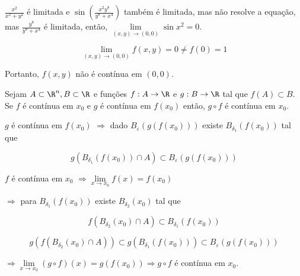 \documentclass[11pt, oneside, a4paper]{gsm-l}
\begin{document}
\begin{sol}
    $\displaystyle \frac{{x^2 }}{{x^2  + y^2 }}$ é limitada e $\displaystyle \sin \left( {\frac{{x^2 y^8 }}{{y^8  + x^4 }}} \right)$ também é limitada, mas não resolve a equação, mas $\displaystyle \frac{{y^8 }}{{y^8  + x^4 }}$ é limitada, então, $\mathop {\lim }\limits_{\left( {x,y} \right) \to \left( {0,0} \right)} \sin x^2  = 0$.

\[
    \mathop {\lim }\limits_{\left( {x,y} \right) \to \left( {0,0} \right)} f\left( {x,y} \right) = 0 \ne f\left( 0 \right) = 1
\]

Portanto, $f(x,y)$ não é contínua em $(0,0)$.

\end{sol}

\begin{teo}
    Sejam $A \subset \R^n ,B \subset \R$ e funções $f:A \to \R$ e $g:B \to \R$ tal que $f\left( A \right) \subset B$. Se $f$ é contínua em $x_0$ e $g$ é contínua em $f\left( {x_0 } \right)$ então, $g \circ f$ é contínua em $x_0$.
\end{teo}

\begin{dem}
$g$ é contínua em $f\left( {x_0 } \right)$
    $\Rightarrow$ dado $B_\varepsilon  \left( {g\left( {f\left( {x_0 } \right)} \right)} \right)$ existe $B_{\delta _1 } \left( {f\left( {x_0 } \right)} \right)$ tal que

\[
    g\left( {B_{\delta _1 } \left( {f\left( {x_0 } \right)} \right) \cap A} \right) \subset B_\varepsilon  \left( {g\left( {f\left( {x_0 } \right)} \right)} \right)
\]

    $f$ é contínua em $x_0$ $\Rightarrow \mathop {\lim }\limits_{x \to x_0 } f\left( x \right) = f\left( {x_0 } \right)$

    $\Rightarrow$ para $B_{\delta _1 } \left( {f\left( {x_0 } \right)} \right)$ existe $B_{\delta _2 } \left( {x_0 } \right)$ tal que

\[
    f\left( {B_{\delta _2 } \left( {x_0 } \right) \cap A} \right) \subset B_{\delta _1 } \left( {f\left( {x_0 } \right)} \right)
\]

\[
    g\left( {f\left( {B_{\delta _2 } \left( {x_0 } \right) \cap A} \right)} \right) \subset g\left( {B_{\delta _1 } \left( {f\left( {x_0 } \right)} \right)} \right) \subset B_\varepsilon  \left( {g\left( {f\left( {x_0 } \right)} \right)} \right)
\]

    $\Rightarrow \mathop {\lim }\limits_{x \to x_0 } \left( {g \circ f} \right)\left( x \right) = g\left( {f\left( {x_0 } \right)} \right) \Rightarrow g \circ f$ é contínua em $x_0$.
\end{dem}
\end{document}

